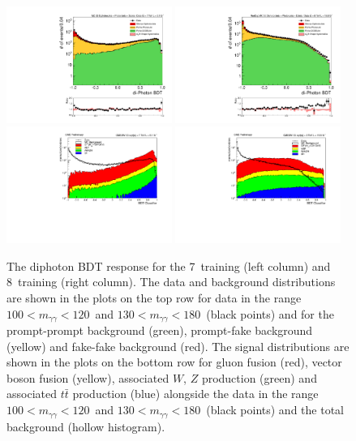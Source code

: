 \begin{figure}
  \includegraphics[width=0.48\textwidth]{ch4_selec_and_cats/plots/diphoBDT_7TeV_bkg.pdf}
  \includegraphics[width=0.48\textwidth]{ch4_selec_and_cats/plots/diphoBDT_8TeV_bkg.pdf} \\
  \includegraphics[width=0.48\textwidth]{ch4_selec_and_cats/plots/diphoBDT_7TeV_sig.pdf} 
  \includegraphics[width=0.48\textwidth]{ch4_selec_and_cats/plots/diphoBDT_8TeV_sig.pdf}
  \caption{The diphoton BDT response for the 7~\TeV training (left column) and 8~\TeV training (right column). The data and background distributions are shown in the plots on the top row for data in the range $100 < m_{\gamma\gamma} < 120$~\GeV and $130 < m_{\gamma\gamma} < 180$~\GeV (black points) and for the prompt-prompt background (green), prompt-fake background (yellow) and fake-fake background (red). The signal distributions are shown in the plots on the bottom row for gluon fusion (red), vector boson fusion (yellow), associated $W$, $Z$ production (green) and associated $t\bar{t}$ production (blue) alongside the data in the range $100 < m_{\gamma\gamma} < 120$~\GeV and $130 < m_{\gamma\gamma} < 180$~\GeV (black points) and the total background (hollow histogram). }
  \label{fig:dipho_bdt}
\end{figure}

